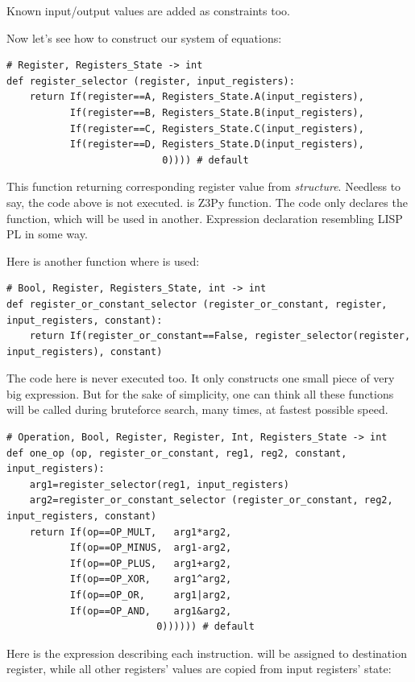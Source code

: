 Known input/output values are added as constraints too.

Now let's see how to construct our system of equations:

\begin{lstlisting}
# Register, Registers_State -> int
def register_selector (register, input_registers):
    return If(register==A, Registers_State.A(input_registers),
           If(register==B, Registers_State.B(input_registers), 
           If(register==C, Registers_State.C(input_registers), 
           If(register==D, Registers_State.D(input_registers), 
                           0)))) # default
\end{lstlisting}

This function returning corresponding register value from \emph{structure}.
Needless to say, the code above is not executed. 
 is Z3Py function. 
The code only declares the function, which will be used in another. 
Expression declaration resembling LISP \ac{PL} in some way.

Here is another function where  is used:

\begin{lstlisting}
# Bool, Register, Registers_State, int -> int
def register_or_constant_selector (register_or_constant, register, input_registers, constant): 
    return If(register_or_constant==False, register_selector(register, input_registers), constant)
\end{lstlisting}

The code here is never executed too. 
It only constructs one small piece of very big expression. 
But for the sake of simplicity, one can think all these functions will be called during bruteforce search, many times,
at fastest possible speed.

\begin{lstlisting}
# Operation, Bool, Register, Register, Int, Registers_State -> int
def one_op (op, register_or_constant, reg1, reg2, constant, input_registers):
    arg1=register_selector(reg1, input_registers)
    arg2=register_or_constant_selector (register_or_constant, reg2, input_registers, constant)
    return If(op==OP_MULT,   arg1*arg2,
           If(op==OP_MINUS,  arg1-arg2,
           If(op==OP_PLUS,   arg1+arg2, 
           If(op==OP_XOR,    arg1^arg2, 
           If(op==OP_OR,     arg1|arg2, 
           If(op==OP_AND,    arg1&arg2, 
                          0)))))) # default
\end{lstlisting}

Here is the expression describing each instruction. 
 will be assigned to destination register,
while all other registers' values are copied from input registers' state:

